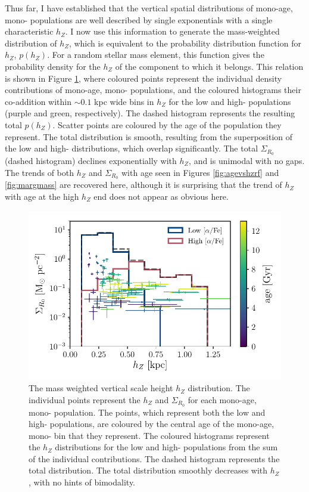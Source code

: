 Thus far, I have established that the vertical spatial distributions of mono-age, mono-\feh{} populations are well described by single exponentials with a single characteristic $h_Z$. I now use this information to generate the mass-weighted distribution of $h_Z$, which is equivalent to the probability distribution function for $h_Z$, $p(h_Z)$. For a random stellar mass element, this function gives the probability density for the $h_Z$ of the component to which it belongs.  This relation is shown in Figure \ref{fig:hzhistogram}, where coloured points represent the individual density contributions of mono-age, mono-\feh{} populations, and the coloured histograms their co-addition within $\sim 0.1$ kpc wide bins in $h_Z$ for the low and high-\afe{} populations (purple and green, respectively). The dashed histogram represents the resulting total $p(h_Z)$. Scatter points are coloured by the age of the population they represent. The total distribution is smooth, resulting from the superposition of the low and high-\afe{} distributions, which overlap significantly.  The total $\Sigma_{R_0}$ (dashed histogram) declines exponentially with $h_Z$, and is unimodal with no gaps. The trends of both $h_Z$ and $\Sigma_{R_0}$ with age seen in Figures \ref{fig:agevshzrf} and \ref{fig:margmass} are recovered here, although it is surprising that the trend of $h_Z$ with age at the high $h_Z$ end does not appear as obvious here.

 \begin{figure}
	\includegraphics[width=\columnwidth]{thesis/Plots/adjusted_hz_sigma.pdf}
 	\centering
     \caption[The mass weighted vertical scale height distribution as calculated using mono-age, mono-\feh{} populations in APOGEE DR12]{The mass weighted vertical scale height $h_Z$ distribution. The individual points represent the $h_Z$ and $\Sigma_{R_0}$ for each mono-age, mono-\feh{} population. The points, which represent both the low and high-\afe{} populations, are coloured by the central age of the mono-age, mono-\feh{} bin that they represent. The coloured histograms represent the $h_Z$ distributions for the low and high-\afe{} populations from the sum of the individual contributions. The dashed histogram represents the total distribution. The total distribution smoothly decreases with $h_Z$, with no hints of bimodality.}
     \label{fig:hzhistogram}
 \end{figure}


